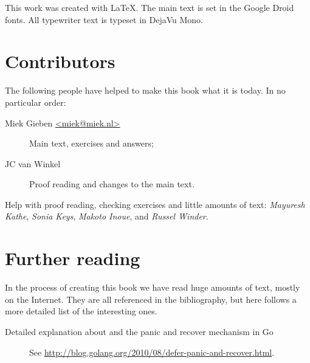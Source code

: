\noindent{}This work was created with \LaTeX. The main text is set in
the Google Droid fonts. All typewriter text is typeset in DejaVu Mono.

\section{Contributors}
The following people have helped to make this book what it is today.
In no particular order:
\begin{description}
\item[Miek Gieben \qquad\url{<miek@miek.nl>}] 
{Main text, exercises and answers;}
\item[JC van Winkel]
{Proof reading and changes to the main text.}
\end{description}

Help with proof reading, checking exercises and little amounts of text:
\emph{Mayuresh Kathe},
\emph{Sonia Keys},
\emph{Makoto Inoue},
and \emph{Russel Winder}.

\section{Further reading}
In the process of creating this book we have read huge amounts of text,
mostly on the Internet. They are all referenced in the bibliography, but
here follows a more detailed list of the interesting ones.
\begin{description}
\item[Detailed explanation about  and the panic and recover
mechanism in Go]{See 
\url{http://blog.golang.org/2010/08/defer-panic-and-recover.html}.}
\end{description}
